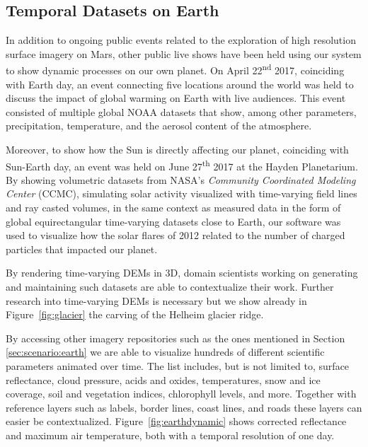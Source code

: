 \documentclass[journal]{vgtc}                %
\newcommand{\fig}[1]{Figure~\ref{fig:#1}}
\begin{document}
\subsection{Temporal Datasets on Earth}

In addition to ongoing public events related to the exploration of high resolution surface imagery on Mars, other public live shows have been held using our system to show dynamic processes on our own planet.
On April 22\textsuperscript{nd} 2017, coinciding with Earth day, an event connecting five locations around the world was held to discuss the impact of global warming on Earth with live audiences.
This event consisted of multiple global NOAA datasets that show, among other parameters, precipitation, temperature, and the aerosol content of the atmosphere.

Moreover, to show how the Sun is directly affecting our planet, coinciding with Sun-Earth day, an event was held on June 27\textsuperscript{th} 2017 at the Hayden Planetarium.
By showing volumetric datasets from NASA's \emph{Community Coordinated Modeling Center} (CCMC), simulating solar activity visualized with time-varying field lines and ray casted volumes, in the same context as measured data in the form of global equirectangular time-varying datasets close to Earth, our software was used to visualize how the solar flares of 2012 related to the number of charged particles that impacted our planet.


By rendering time-varying DEMs in 3D, domain scientists working on generating and maintaining such datasets are able to contextualize their work. Further research into time-varying DEMs is necessary but we show already in \fig{glacier} the carving of the Helheim glacier ridge.

By accessing other imagery repositories such as the ones mentioned in Section \ref{sec:scenario:earth} we are able to visualize hundreds of different scientific parameters animated over time. The list includes, but is not limited to, surface reflectance, cloud pressure, acids and oxides, temperatures, snow and ice coverage, soil and vegetation indices, chlorophyll levels, and more. Together with reference layers such as labels, border lines, coast lines, and roads these layers can easier be contextualized.
\fig{earthdynamic} shows corrected reflectance and maximum air temperature, both with a temporal resolution of one day.
\end{document}
